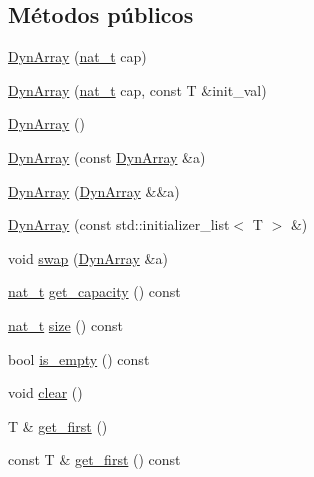 \subsection*{Métodos públicos}
\begin{DoxyCompactItemize}
\item 
\hyperlink{class_designar_1_1_dyn_array_a9a00e1336657f98b96e7c38fc7da332c}{Dyn\+Array} (\hyperlink{namespace_designar_aa72662848b9f4815e7bf31a7cf3e33d1}{nat\+\_\+t} cap)
\item 
\hyperlink{class_designar_1_1_dyn_array_afc29c646a101761f0e7a6fb8080b38fd}{Dyn\+Array} (\hyperlink{namespace_designar_aa72662848b9f4815e7bf31a7cf3e33d1}{nat\+\_\+t} cap, const T \&init\+\_\+val)
\item 
\hyperlink{class_designar_1_1_dyn_array_ad51d585e1ee5f4fb0649e3e96392817b}{Dyn\+Array} ()
\item 
\hyperlink{class_designar_1_1_dyn_array_ad9a7d66713068ccea6a5d7fb430f59e3}{Dyn\+Array} (const \hyperlink{class_designar_1_1_dyn_array}{Dyn\+Array} \&a)
\item 
\hyperlink{class_designar_1_1_dyn_array_a59a55c42901c2687505ecfbc3d577a44}{Dyn\+Array} (\hyperlink{class_designar_1_1_dyn_array}{Dyn\+Array} \&\&a)
\item 
\hyperlink{class_designar_1_1_dyn_array_a8bea25568b1f9292c2cb221b774ece13}{Dyn\+Array} (const std\+::initializer\+\_\+list$<$ T $>$ \&)
\item 
void \hyperlink{class_designar_1_1_dyn_array_a70d4d7e34ed05280f849adb6aa20180d}{swap} (\hyperlink{class_designar_1_1_dyn_array}{Dyn\+Array} \&a)
\item 
\hyperlink{namespace_designar_aa72662848b9f4815e7bf31a7cf3e33d1}{nat\+\_\+t} \hyperlink{class_designar_1_1_dyn_array_afa027281e5790d05269d5972ec2ea177}{get\+\_\+capacity} () const
\item 
\hyperlink{namespace_designar_aa72662848b9f4815e7bf31a7cf3e33d1}{nat\+\_\+t} \hyperlink{class_designar_1_1_dyn_array_a7261fdb2ace9cdefbacb49d06c2f919d}{size} () const
\item 
bool \hyperlink{class_designar_1_1_dyn_array_ae4692786599e9be77a9ca963b2fe7bf8}{is\+\_\+empty} () const
\item 
void \hyperlink{class_designar_1_1_dyn_array_abea6b41f8373dc60753255f3c390507f}{clear} ()
\item 
T \& \hyperlink{class_designar_1_1_dyn_array_a85d8c50ef17c71d675961ba0268c2278}{get\+\_\+first} ()
\item 
const T \& \hyperlink{class_designar_1_1_dyn_array_a0b8735deaef51cfc0ff7c84994c3d838}{get\+\_\+first} () const

\end{DoxyCompactItemize}
